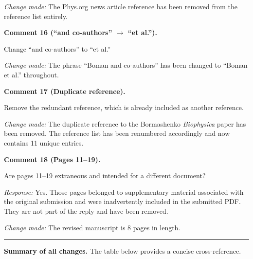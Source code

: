 \documentclass[12pt,a4paper]{article}
\newcommand{\point}[1]{\medskip\noindent\textbf{Comment #1.}\enspace}
\newcommand{\response}{\noindent\textit{Response:}\enspace}
\newcommand{\change}{\noindent\textit{Change made:}\enspace}
\begin{document}
\change
The Phys.org news article reference has been removed from the reference
list entirely.

\point{16 (``and co-authors'' $\to$ ``et al.'')}

\begin{reviewbox}
Change ``and co-authors'' to ``et al.''
\end{reviewbox}

\change
The phrase ``Boman and co-authors'' has been changed to
``Boman et al.'' throughout.

\point{17 (Duplicate reference)}

\begin{reviewbox}
Remove the redundant reference, which is already included as another
reference.
\end{reviewbox}

\change
The duplicate reference to the Bormashenko \textit{Biophysica} paper
has been removed.
The reference list has been renumbered accordingly and now contains
11 unique entries.

\point{18 (Pages 11--19)}

\begin{reviewbox}
Are pages 11--19 extraneous and intended for a different document?
\end{reviewbox}

\response
Yes. Those pages belonged to supplementary material associated with the
original submission and were inadvertently included in the submitted PDF.
They are not part of the reply and have been removed.

\change
The revised manuscript is 8 pages in length.

\bigskip
\hrule
\bigskip

\noindent\textbf{Summary of all changes.}
The table below provides a concise cross-reference.
\end{document}
